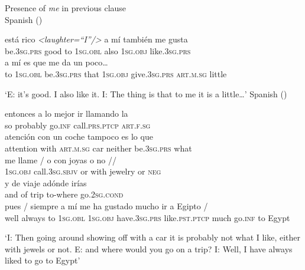 \documentclass[output=paper]{langscibook}
\begin{document}
\ea%
    Presence of \textit{me} in previous clause\label{ex:brown:6}\\
    \ea Spanish () \label{ex:brown:6a}\\
    \begin{xlist}
    \gll está rico \emph{<laughter=“I”/>} a mí también me gusta\\
		 be.\textsc{3sg.prs} good {} to \textsc{1sg.obl} also \textsc{1sg.obj} like.\textsc{3sg.prs}\\
	\gll a mí es que me da un poco…\\
         to \textsc{1sg.obl} be\textsc{.3sg.prs} that \textsc{1sg.obj} give\textsc{.3sg.prs} \textsc{art.m.sg} little\\
	\end{xlist}
    \glt ‘E: it’s good. I also like it.  I: The thing is that to me it is a little…’
    \ex Spanish () \label{ex:brown:6b}\\
    \begin{xlist}
    \gll entonces {a lo mejor} ir llamando la \\ 
         so probably go.\textsc{inf} call.\textsc{prs.ptcp} \textsc{art.f.sg} \\
    \gll atención con un coche tampoco es {lo que} \\ 
         attention with \textsc{art.m.sg} car neither be.\textsc{3sg.prs} what \\ 
     \gll me llame / o con joyas o no // \\     
         \textsc{1sg.obj} call.\textsc{3sg.sbjv} {} or with jewelry or \textsc{neg}\\
    \gll y de viaje adónde irías \\
           and of trip to-where go.\textsc{2sg.cond}\\
    \gll pues / siempre a mí me ha gustado mucho ir a Egipto /\\
         well {} always to \textsc{1sg.obl} \textsc{1sg.obj} have.\textsc{3sg.prs} like.\textsc{pst.ptcp} much go.\textsc{inf} to Egypt\\
    \end{xlist}
    \glt ‘I: Then going around showing off with a car it is probably not what I like, either with jewels or not. E: and where would you go on a trip? I: Well, I have always liked to go to Egypt’
    \z
\z
\end{document}
